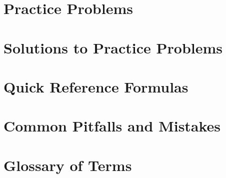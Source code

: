 \documentclass[8pt, a4paper, landscape]{extarticle}
\begin{document}
\begin{multicols*}{3}

\section*{Practice Problems}

\section*{Solutions to Practice Problems}
\columnbreak

\section*{Quick Reference Formulas}

\section*{Common Pitfalls and Mistakes}

\section*{Glossary of Terms}

\end{multicols*}
\end{document}
